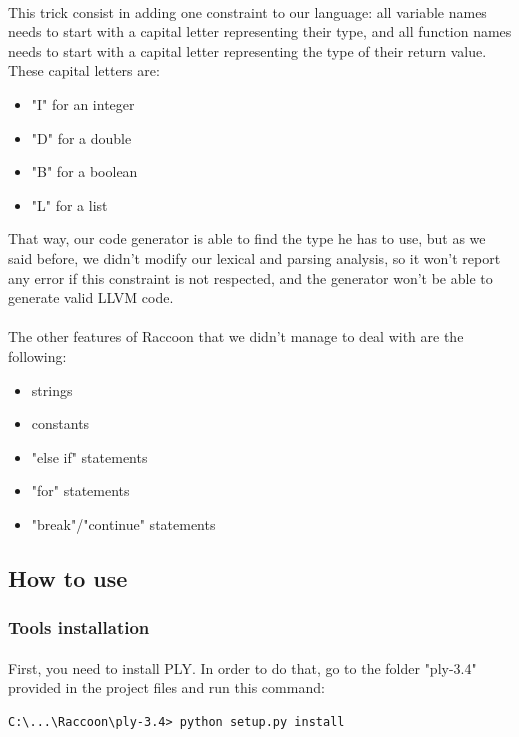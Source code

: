 \documentclass[12pt,a4paper]{article}
\begin{document}
\paragraph{}
This trick consist in adding one constraint to our language: all variable names needs to start with a capital letter representing their type, and all function names needs to start with a capital letter representing the type of their return value. These capital letters are:
\begin{itemize}
\item "I" for an integer
\item "D" for a double
\item "B" for a boolean
\item "L" for a list
\end{itemize}
That way, our code generator is able to find the type he has to use, but as we said before, we didn't modify our lexical and parsing analysis, so it won't report any error if this constraint is not respected, and the generator won't be able to generate valid LLVM code.

\paragraph{}
The other features of Raccoon that we didn't manage to deal with are the following:
\begin{itemize}
\item strings
\item constants
\item "else if" statements
\item "for" statements
\item "break"/"continue" statements
\end{itemize}


\subsection{How to use}

\subsubsection{Tools installation}
\paragraph{}
First, you need to install PLY. In order to do that, go to the folder "ply-3.4" provided in the project files and run this command:
\begin{verbatim}
C:\...\Raccoon\ply-3.4> python setup.py install
\end{verbatim}
\end{document}
